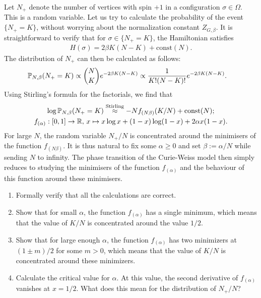 Let $N_+$ denote the number of vertices with spin $+1$ in a configuration $\sigma\in\Omega$.
This is a random variable.
Let us try to calculate the probability of the event $\{N_+=K\}$,
without worrying about the normalization constant $Z_{G,\beta}$.
It is straightforward to verify that for $\sigma\in\{N_+=K\}$,
the Hamiltonian satisfies
\begin{align}
    H(\sigma)=2\beta K(N-K) + \text{const}(N).
\end{align}
The distribution of $N_+$ can then be calculated as follows:
\begin{align}
    \label{eq:CurieWeissDistribution}
    \P_{N,\beta}(N_+ = K) &\propto \binom{N}{K} e^{-2\beta  K(N-K)}
    \propto \frac1{K! (N-K)!} e^{-2\beta K (N-K)}.
\end{align}
Using Stirling's formula for the factorials, we find that
\begin{gather}
    \log\P_{N,\beta}(N_+ = K) 
    \stackrel{\text{Stirling}}{\approx}
    -N f_{(N\beta)}(K/N) + \text{const}(N);
    \\
    f_{(\alpha)}:[0,1]\to\R,\,
    x\mapsto x \log x + (1-x)\log (1-x) + 2 \alpha x (1-x).
\end{gather}
For large $N$, the random variable $N_+/N$ is concentrated
around the minimisers of the function $f_{(N\beta)}$.
It is thus natural to fix some $\alpha\geq 0$ and set $\beta:=\alpha/N$
while sending $N$ to infinity.
The phase transition of the Curie-Weiss model then simply reduces to studying
the minimisers of the function $f_{(\alpha)}$ and the behaviour of this function
around these minimisers.

\begin{exercise}
    \begin{enumerate}
        \item Formally verify that all the calculations are correct.
        \item Show that for small $\alpha$, the function \( f_{(\alpha)} \) has a single minimum, which means that the value of \( K/N \) is concentrated around the value \( 1/2 \).
        \item Show that for large enough $\alpha$, the function \( f_{(\alpha)} \) has two minimizers at \( (1 \pm m)/2 \) for some $m>0$, which means that the value of \( K/N \) is concentrated around these minimizers.
        \item Calculate the critical value for $\alpha$. At this value, the second derivative of \( f_{(\alpha)} \) vanishes at \( x=1/2 \). What does this mean for the distribution of \( N_+/N \)?
    \end{enumerate}
\end{exercise}

